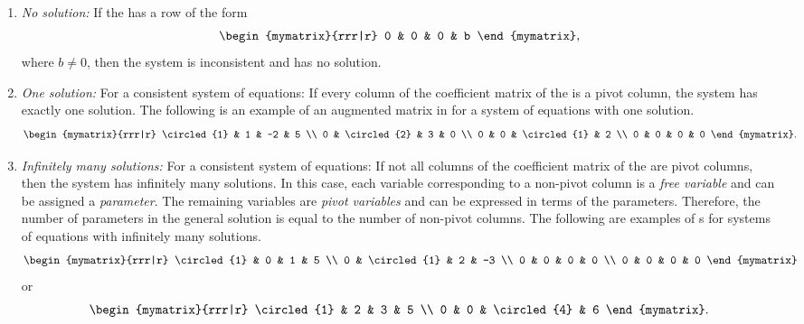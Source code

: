 \begin{enumerate}
\item {\em No solution:} If the {\ef} has a row of the form
  \[
    \begin{mymatrix}{rrr|r}
      0 & 0 & 0 & b
    \end{mymatrix},
  \]
  where $b\neq 0$, then the system is inconsistent and has no
  solution.

\item {\em One solution:} For a consistent system of equations: If
  every column of the coefficient matrix of the {\ef} is a pivot
  column, the system has exactly one solution. The following is an
  example of an augmented matrix in {\ef} for a system of equations
  with one solution.
  \begin{equation*}
    \begin{mymatrix}{rrr|r}
      \circled{1} & 1 & -2 & 5 \\
      0 & \circled{2} & 3 & 0 \\ 
      0 & 0 & \circled{1} & 2 \\
      0 & 0 & 0 & 0 
    \end{mymatrix}.
  \end{equation*}

\item {\em Infinitely many solutions:} For a consistent system of
  equations: If not all columns of the coefficient matrix of the {\ef}
  are pivot columns, then the system has infinitely many solutions.
  In this case, each variable corresponding to a non-pivot column is a
  {\em free variable} and
  can be assigned a {\em parameter}. The remaining
  variables are
  {\em pivot variables}
  and can be expressed in terms of the parameters. Therefore, the
  number of parameters in the general solution is equal to the number
  of non-pivot columns.
  The following are examples of {\ef}s for systems of equations with
  infinitely many solutions.
  \begin{equation*}
    \begin{mymatrix}{rrr|r}
      \circled{1} & 0 & 1 & 5 \\
      0 & \circled{1} & 2 & -3 \\ 
      0 & 0 & 0 & 0 \\
      0 & 0 & 0 & 0 
    \end{mymatrix}
  \end{equation*}
  or
  \begin{equation*}
    \begin{mymatrix}{rrr|r}
      \circled{1} & 2 & 3 & 5 \\
      0 & 0 & \circled{4} & 6
    \end{mymatrix}.
\end{equation*}
\end{enumerate}

